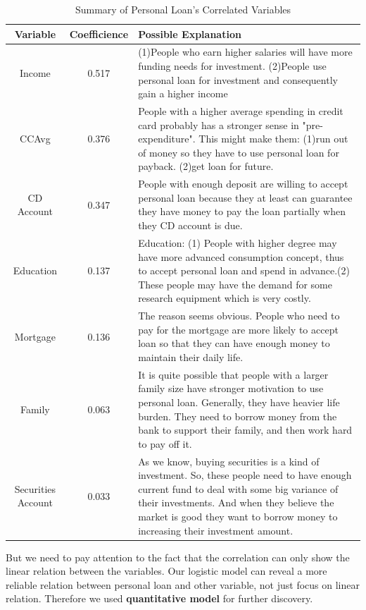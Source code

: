\documentclass[]{article}
\begin{document}
\begin{table}[H]
	\centering
	\caption{Summary of Personal Loan's Correlated Variables}
	\begin{tabular}{|c|c|p{10cm}|} 
	\hline
		Variable & Coefficience & Possible Explanation\\ \hline
		Income & 0.517 & (1)People who earn higher salaries will have more funding needs for investment. (2)People use personal loan for investment and consequently gain a higher income\\ \hline
		CCAvg & 0.376 & People with a higher average spending in credit card probably has a stronger sense in "pre-expenditure". This might make them: (1)run out of money so they have to use personal loan for payback. (2)get loan for future. \\ \hline
		CD Account & 0.347 & People with enough deposit are willing to accept personal loan because they at least can guarantee they have money to pay the loan partially when they CD account is due.\\ \hline
		Education & 0.137 & Education: (1) People with higher degree may have more advanced consumption concept, thus to accept personal loan and spend in advance.(2) These people may have the demand for some research equipment which is very costly.\\ \hline
		Mortgage & 0.136 & The reason seems obvious. People who need to pay for the mortgage are more likely to accept loan so that they can have enough money to maintain their daily life.\\ \hline
		Family & 0.063 & It is quite possible that people with a larger family size have stronger motivation to use personal loan. Generally, they have heavier life burden. They need to borrow money from the bank to support their family, and then work hard to pay off it.\\ \hline
		Securities Account & 0.033 & As we know, buying securities is a kind of investment. So, these people need to have enough current fund to deal with some big variance of their investments. And when they believe the market is good they want to borrow money to increasing their investment amount.\\ \hline	
	\end{tabular}
\end{table}

But we need to pay attention to the fact that the correlation can only show the linear relation between the variables. Our logistic model can reveal a more reliable relation between personal loan and other variable, not just focus on linear relation. Therefore we used \textbf{quantitative model} for further discovery.\\
\end{document}
